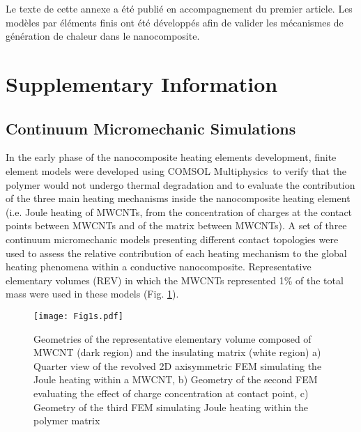 
Le texte de cette annexe a été publié en accompagnement du premier article. 
Les modèles par éléments finis ont été développés afin de valider les mécanismes de génération de chaleur dans le nanocomposite. 

\section{Supplementary Information}

\subsection{Continuum Micromechanic Simulations}

In the early phase of the nanocomposite heating elements development, finite element models were developed using COMSOL Mul\-ti\-phy\-sics\-\textregistered \ to verify that the polymer would not undergo thermal degradation and to evaluate the contribution of the three main heating mechanisms inside the nanocomposite heating element (i.e. Joule heating of MWCNTs, from the concentration of charges at the contact points between MWCNTs and of the matrix between MWCNTs).  
A set of three continuum micromechanic models presenting different contact topologies were used to assess the relative contribution of each heating mechanism to the global heating phenomena within a conductive nanocomposite. 
Representative elementary volumes (REV) in which the MWCNTs represented 1\% of the total mass were used in these models (Fig. \ref{fig:geometry}). 

\begin{figure}[htb]
	\centering
	\texttt{[image: Fig1s.pdf]}
	\caption{Geometries of the representative elementary volume composed of MWCNT (dark region) and the insulating matrix (white region) a) Quarter view of the revolved 2D axisymmetric FEM simulating the Joule heating within a MWCNT, b) Geometry of the second FEM evaluating the effect of charge concentration at contact point, c) Geometry of the third FEM simulating Joule heating within the polymer matrix \cite{Brassard2018_figshare_article1}}
	\label{fig:geometry}
\end{figure}

